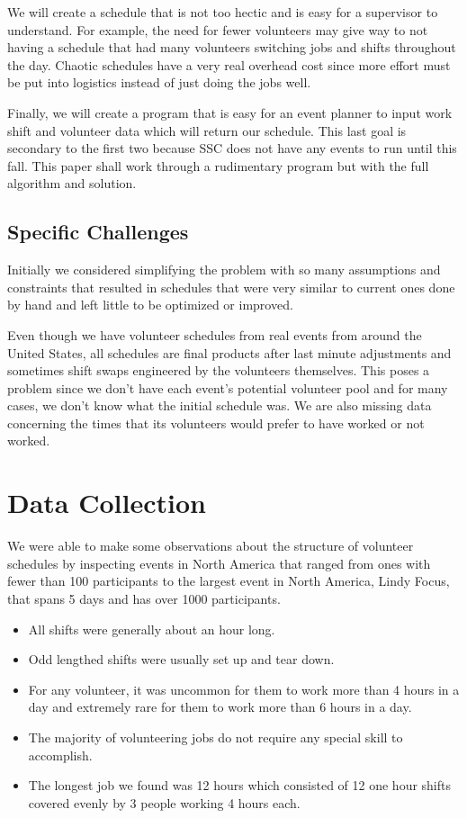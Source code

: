\documentclass[11pt]{article}
\theoremstyle{definition}
\begin{document}
\begin{multicols}{2}
We will create a schedule that is not too hectic and is easy for a supervisor to understand.
For example, the need for fewer volunteers may give way to not having a schedule that had many volunteers switching jobs and shifts throughout the day.
Chaotic schedules have a very real overhead cost since more effort must be put into logistics instead of just doing the jobs well.

Finally, we will create a program that is easy for an event planner to input work shift and volunteer data which will return our schedule.
This last goal is secondary to the first two because SSC does not have any events to run until this fall.
This paper shall work through a rudimentary program but with the full algorithm and solution.
\subsection{Specific Challenges}
Initially we considered simplifying the problem with so many assumptions and constraints that resulted in schedules that were very similar to current ones done by hand and left little to be optimized or improved.

Even though we have volunteer schedules from real events from around the United States, all schedules are final products after last minute adjustments and sometimes shift swaps engineered by the volunteers themselves.
This poses a problem since we don't have each event's potential volunteer pool and for many cases, we don't know what the initial schedule was.
We are also missing data concerning the times that its volunteers would prefer to have worked or not worked.

%
%
\section{Data Collection}
We were able to make some observations about the structure of volunteer schedules by inspecting events in North America that ranged from ones with fewer than 100 participants to the largest event in North America, Lindy Focus, that spans 5 days and has over 1000 participants.
\begin{itemize}\itemsep0pt
\item All shifts were generally about an hour long.
\item Odd lengthed shifts were usually set up and tear down.
\item For any volunteer, it was uncommon for them to work more than 4 hours in a day and extremely rare for them to work more than 6 hours in a day.
\item The majority of volunteering jobs do not require any special skill to accomplish.
\item The longest job we found was 12 hours which consisted of 12 one hour shifts covered evenly by 3 people working 4 hours each.


\end{itemize}
\end{multicols}
\end{document}
